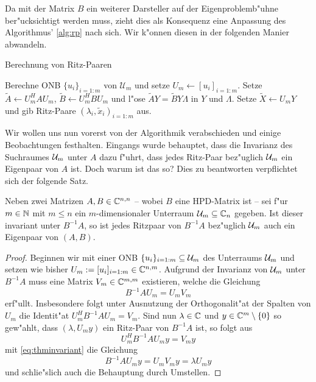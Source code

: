 Da mit der Matrix $B$ ein weiterer Darsteller auf der Eigenproblemb"uhne ber"ucksichtigt werden muss, zieht dies als Konsequenz eine Anpassung des Algorithmus' \ref{alg:rp} nach sich. Wir k"onnen diesen in der folgenden Manier abwandeln.

\begin{algorithm}\label{alg:grp}
\caption{Berechnung von Ritz-Paaren}
\begin{algorithmic}[1]
\State Berechne ONB $\{u_i\}_{i=1:m}$ von $\mathcal{U}_m$ und setze $U_m\gets[u_i]_{i=1:m}$.
\State Setze $\widetilde{A}\gets U_m^H A U_m$,
$\widetilde{B} \gets U_m^H BU_m$ und
l"ose $\widetilde{A}Y = \widetilde{B}Y \Lambda$ in $Y$ und $\Lambda$.
\State Setze $\widetilde{X} \gets U_m Y$ und gib Ritz-Paare $(\lambda_i, \widetilde{x}_i)_{i=1:m}$ aus.
\end{algorithmic}
\end{algorithm}

Wir wollen uns nun vorerst von der Algorithmik verabschieden und einige Beobachtungen
festhalten. Eingangs wurde behauptet, dass die Invarianz des Suchraumes $\mathcal{U}_m$ unter
$A$ dazu f"uhrt, dass jedes Ritz-Paar bez"uglich $\mathcal{U}_m$ ein Eigenpaar von $A$ ist.
Doch warum ist das so? Dies zu beantworten verpflichtet sich der folgende Satz.

\begin{thm}\label{thm:invariant}
Neben zwei Matrizen $A,B\in\mathbb{C}^{n,n}$ -- wobei $B$ eine HPD-Matrix ist -- sei f"ur
$m\in\mathbb{N}$ mit $m\le n$ ein $m$-dimensionaler Unterraum $\mathcal{U}_m \subseteq \mathbb{C}_n$ gegeben.
Ist dieser invariant unter $B^{-1}A$, so ist jedes Ritzpaar von $B^{-1}A$
bez"uglich $\mathcal{U}_m$ auch ein Eigenpaar von $(A,B)$.
\end{thm}

\begin{proof}
Beginnen wir mit einer ONB $\{u_i\}_{i=1:m}\subseteq\mathcal{U}_m$ des Unterraums $\mathcal{U}_m$
und setzen wie bisher $U_m := [u_i]_{i=1:m}\in\mathbb{C}^{n,m}$. Aufgrund der Invarianz
von $\mathcal{U}_m$ unter $B^{-1}A$ muss eine Matrix $V_m \in \mathbb{C}^{m,m}$ existieren, welche
die Gleichung
\begin{equation}\label{eq:thminvariant}
B^{-1}A U_m = U_m V_m
\end{equation}
erf"ullt. Insbesondere folgt unter Ausnutzung der Orthogonalit"at der Spalten
von $U_m$ die Identit"at $U_m^H B^{-1}A U_m = V_m$.
Sind nun $\lambda\in\mathbb{C}$ und $y\in\mathbb{C}^m\setminus\{0\}$ so gew"ahlt, dass $(\lambda, U_m y)$
ein Ritz-Paar von $B^{-1}A$ ist, so folgt aus
\[
U_m^H B^{-1}A U_m y = V_m y
\]
mit \eqref{eq:thminvariant} die Gleichung
\[
B^{-1}AU_m y = U_m V_m y = \lambda U_m y
\]
und schlie"slich auch die Behauptung durch Umstellen.
\end{proof}

